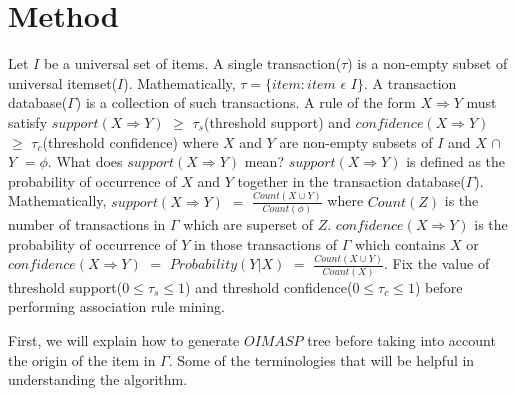 \documentclass[review]{elsarticle}
\begin{document}
\section{Method}
Let $ I $ be a universal set of items. A single transaction($ \tau $) is a non-empty subset of universal itemset($ I $). Mathematically, $ \tau = \lbrace item : item$ $\epsilon $ $ I \rbrace$. A transaction database($ \Gamma $) is a collection of such transactions. A rule of the form $ X \Rightarrow  Y $ must satisfy $ support(X \Rightarrow Y) $ $ \geq $ $ \tau _{s} $(threshold support) and $ confidence(X \Rightarrow Y) $ $ \geq $ $ \tau _{c} $(threshold confidence) where $ X $ and $ Y $ are non-empty subsets of $ I $ and $ X $ $ \cap $ $ Y $ $ = \phi $. What does $ support(X \Rightarrow Y) $ mean? $ support(X \Rightarrow Y) $ is defined as the probability of occurrence of $ X $ and $ Y $ together in the transaction database($ \Gamma $). Mathematically, $ support(X \Rightarrow Y) $ $ = $ $ \frac{Count(X \cup Y)}{Count(\phi)} $ where $ Count(Z) $ is the number of transactions in $ \Gamma $ which are superset of $ Z $. $ confidence(X \Rightarrow Y) $ is the probability of occurrence of $ Y $ in those transactions of $ \Gamma $ which contains $ X $ or $ confidence(X \Rightarrow Y) $ $ = $ $ Probability(Y  \vert  X) $ $ = $ $ \frac{Count(X \cup Y)}{Count(X)} $. Fix the value of threshold support($ 0 \leq \tau _{s} \leq 1 $) and threshold confidence($ 0 \leq \tau _{c} \leq 1 $) before performing association rule mining.

First, we will explain how to generate $ OIMASP $ tree before taking into account the origin of the item in $ \Gamma $. Some of the terminologies that will be helpful in understanding the algorithm.
\end{document}
